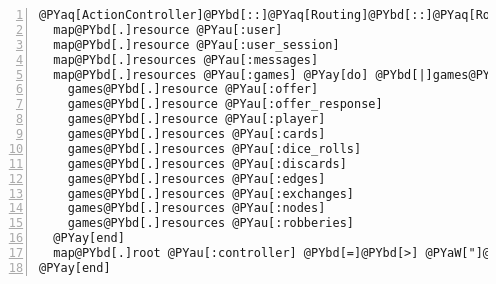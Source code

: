 \begin{Verbatim}[commandchars=@\[\],numbers=left,firstnumber=1,stepnumber=1]
@PYaq[ActionController]@PYbd[::]@PYaq[Routing]@PYbd[::]@PYaq[Routes]@PYbd[.]draw @PYay[do] @PYbd[|]map@PYbd[|]
  map@PYbd[.]resource @PYau[:user]
  map@PYbd[.]resource @PYau[:user_session]
  map@PYbd[.]resources @PYau[:messages]
  map@PYbd[.]resources @PYau[:games] @PYay[do] @PYbd[|]games@PYbd[|]
    games@PYbd[.]resource @PYau[:offer]
    games@PYbd[.]resource @PYau[:offer_response]
    games@PYbd[.]resource @PYau[:player]
    games@PYbd[.]resources @PYau[:cards]
    games@PYbd[.]resources @PYau[:dice_rolls]
    games@PYbd[.]resources @PYau[:discards]
    games@PYbd[.]resources @PYau[:edges]
    games@PYbd[.]resources @PYau[:exchanges]
    games@PYbd[.]resources @PYau[:nodes]
    games@PYbd[.]resources @PYau[:robberies]
  @PYay[end]
  map@PYbd[.]root @PYau[:controller] @PYbd[=]@PYbd[>] @PYaW["]@PYaW[games]@PYaW["], @PYau[:action] @PYbd[=]@PYbd[>] @PYaW["]@PYaW[index]@PYaW["]
@PYay[end]
\end{Verbatim}
